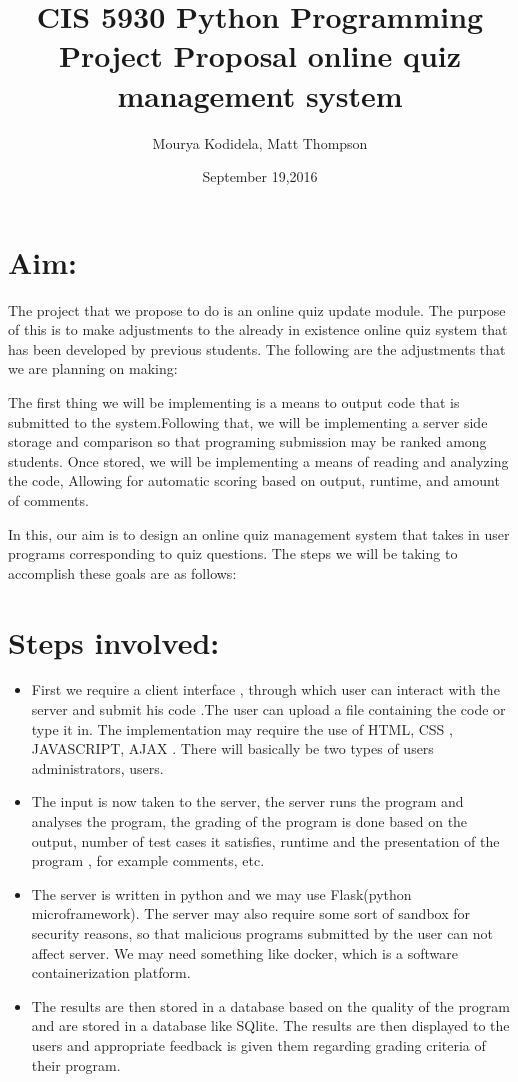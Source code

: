 \documentclass{article}
\title{CIS 5930 Python Programming Project Proposal online quiz management system}
\author{Mourya Kodidela, Matt Thompson}
\date{September 19,2016}
\begin{document}
\maketitle

\section{Aim:}
The project that we propose to do is an online quiz update module. The purpose of this is to make adjustments to the already in existence online quiz system that has been developed by previous students. The following are the adjustments that we are planning on making:

The first thing we will be implementing is a means to output code that is submitted to the system.Following that, we will be implementing a server side storage and comparison so that programing submission may be ranked among students.
Once stored, we will be implementing a means of reading and analyzing the code, Allowing for automatic scoring based on output, runtime, and amount of comments.

In this, our aim is to design an online quiz management system that takes in user programs corresponding to quiz questions. The steps we will be taking to accomplish these goals are as follows:

\section{Steps involved:} 
  \begin{itemize}
   
  \item First we require a client interface , through which user can interact with the server and submit his code .The user can upload a file containing the code or type it in. The implementation may require the use of HTML, CSS , JAVASCRIPT, AJAX . There will basically be two types of users administrators, users.
 \item 
 The input is now taken to the server, the server runs the program and analyses the program, the grading of the program is done based on the output, number of test cases it satisfies, runtime and the presentation of the program , for example comments, etc. 
 \item
 The server is written in python and we may use Flask(python microframework). The server may also require some sort of sandbox for security reasons, so that malicious programs submitted by the user can not affect server.
 We may need something like docker, which is a software containerization platform.
 \item 
 The results are then stored in a database based on the quality of the program and are stored in a database like SQlite. The results are then displayed to the users and appropriate feedback is given them regarding grading criteria of their program.
 
\end{itemize}
\end{document}
